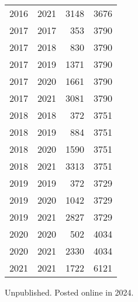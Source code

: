 \documentclass[
  11pt,
  letterpaper,
  DIV=11,
  numbers=noendperiod,
  twoside]{scrartcl}
\begin{document}
\begin{longtable}[]{@{}rrrr@{}}
2016 & 2021 & 3148 & 3676 \\
2017 & 2017 & 353 & 3790 \\
2017 & 2018 & 830 & 3790 \\
2017 & 2019 & 1371 & 3790 \\
2017 & 2020 & 1661 & 3790 \\
2017 & 2021 & 3081 & 3790 \\
2018 & 2018 & 372 & 3751 \\
2018 & 2019 & 884 & 3751 \\
2018 & 2020 & 1590 & 3751 \\
2018 & 2021 & 3313 & 3751 \\
2019 & 2019 & 372 & 3729 \\
2019 & 2020 & 1042 & 3729 \\
2019 & 2021 & 2827 & 3729 \\
2020 & 2020 & 502 & 4034 \\
2020 & 2021 & 2330 & 4034 \\
2021 & 2021 & 1722 & 6121 \\

\end{longtable}



\noindent Unpublished. Posted online in 2024.
\end{document}
